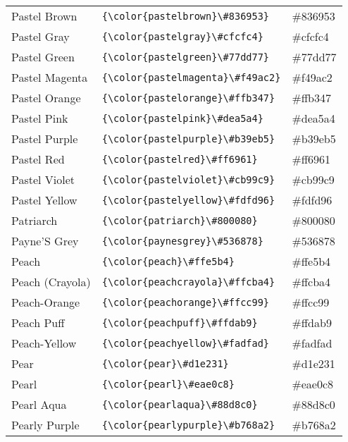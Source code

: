 \documentclass[9.5pt]{article}
\begin{document}
\begin{longtable}{l | l | l}
	Pastel Brown & \verb!{\color{pastelbrown}\#836953}! & {\color{pastelbrown}\#836953}\\
	Pastel Gray & \verb!{\color{pastelgray}\#cfcfc4}! & {\color{pastelgray}\#cfcfc4}\\
	Pastel Green & \verb!{\color{pastelgreen}\#77dd77}! & {\color{pastelgreen}\#77dd77}\\
	Pastel Magenta & \verb!{\color{pastelmagenta}\#f49ac2}! & {\color{pastelmagenta}\#f49ac2}\\
	Pastel Orange & \verb!{\color{pastelorange}\#ffb347}! & {\color{pastelorange}\#ffb347}\\
	Pastel Pink & \verb!{\color{pastelpink}\#dea5a4}! & {\color{pastelpink}\#dea5a4}\\
	Pastel Purple & \verb!{\color{pastelpurple}\#b39eb5}! & {\color{pastelpurple}\#b39eb5}\\
	Pastel Red & \verb!{\color{pastelred}\#ff6961}! & {\color{pastelred}\#ff6961}\\
	Pastel Violet & \verb!{\color{pastelviolet}\#cb99c9}! & {\color{pastelviolet}\#cb99c9}\\
	Pastel Yellow & \verb!{\color{pastelyellow}\#fdfd96}! & {\color{pastelyellow}\#fdfd96}\\
	Patriarch & \verb!{\color{patriarch}\#800080}! & {\color{patriarch}\#800080}\\
	Payne'S Grey & \verb!{\color{paynesgrey}\#536878}! & {\color{paynesgrey}\#536878}\\
	Peach & \verb!{\color{peach}\#ffe5b4}! & {\color{peach}\#ffe5b4}\\
	Peach (Crayola) & \verb!{\color{peachcrayola}\#ffcba4}! & {\color{peachcrayola}\#ffcba4}\\
	Peach-Orange & \verb!{\color{peachorange}\#ffcc99}! & {\color{peachorange}\#ffcc99}\\
	Peach Puff & \verb!{\color{peachpuff}\#ffdab9}! & {\color{peachpuff}\#ffdab9}\\
	Peach-Yellow & \verb!{\color{peachyellow}\#fadfad}! & {\color{peachyellow}\#fadfad}\\
	Pear & \verb!{\color{pear}\#d1e231}! & {\color{pear}\#d1e231}\\
	Pearl & \verb!{\color{pearl}\#eae0c8}! & {\color{pearl}\#eae0c8}\\
	Pearl Aqua & \verb!{\color{pearlaqua}\#88d8c0}! & {\color{pearlaqua}\#88d8c0}\\
	Pearly Purple & \verb!{\color{pearlypurple}\#b768a2}! & {\color{pearlypurple}\#b768a2}\\

\end{longtable}
\end{document}
